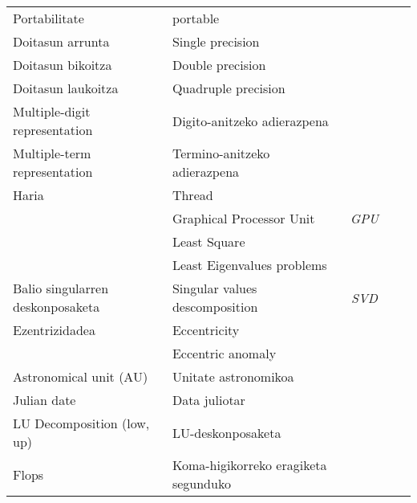 \begin{table}
\begin{tabular}{ l l c c c }
 Portabilitate                           &  portable                            &              &                  \\
 Doitasun arrunta                        &  Single precision                    &              &                  \\
 Doitasun bikoitza                       &  Double precision                    &              &                  \\
 Doitasun laukoitza                      &  Quadruple precision                 &              &                  \\
 Multiple-digit representation           &  Digito-anitzeko adierazpena         &              &                  \\
 Multiple-term representation            &  Termino-anitzeko adierazpena        &              &                  \\  
 Haria                                   &  Thread                              &              &                  \\
                                         &  Graphical Processor Unit            &  \emph{GPU}  &                  \\
                                         &  Least Square                        &              &                  \\
                                         &  Least Eigenvalues problems          &              &                  \\
 Balio singularren deskonposaketa        &  Singular values descomposition      & \emph{SVD}   &                  \\
 Ezentrizidadea                          &  Eccentricity                        &              &                  \\
                                         &  Eccentric anomaly                   &              &                  \\
 Astronomical unit (AU)                  &  Unitate astronomikoa                &              &                  \\
 Julian date                             &  Data juliotar                       &              &                  \\
 LU Decomposition  (low, up)             &  LU-deskonposaketa                   &              &                  \\ 
 Flops                                   &  Koma-higikorreko eragiketa segunduko &             &                  \\   

\end{tabular}
\end{table}
